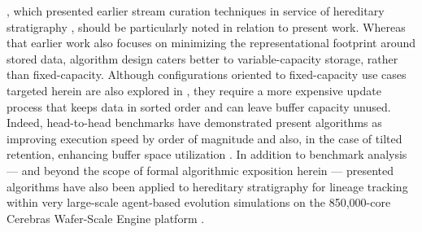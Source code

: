 
\citet{moreno2024algorithms}, which presented earlier stream curation techniques in service of hereditary stratigraphy \citep{moreno2022hstrat}, should be particularly noted in relation to present work.
Whereas that earlier work also focuses on minimizing the representational footprint around stored data, algorithm design caters better to variable-capacity storage, rather than fixed-capacity.
Although configurations oriented to fixed-capacity use cases targeted herein are also explored in \citet{moreno2024algorithms}, they require a more expensive update process that keeps data in sorted order and can leave buffer capacity unused.
Indeed, head-to-head benchmarks have demonstrated present algorithms as improving execution speed by order of magnitude and also, in the case of tilted retention, enhancing buffer space utilization \citep{moreno2024guide,moreno2024trackable}.
In addition to benchmark analysis --- and beyond the scope of formal algorithmic exposition herein --- presented algorithms have also been applied to hereditary stratigraphy for lineage tracking within very large-scale agent-based evolution simulations on the 850,000-core Cerebras Wafer-Scale Engine platform \citep{moreno2024trackable}.
